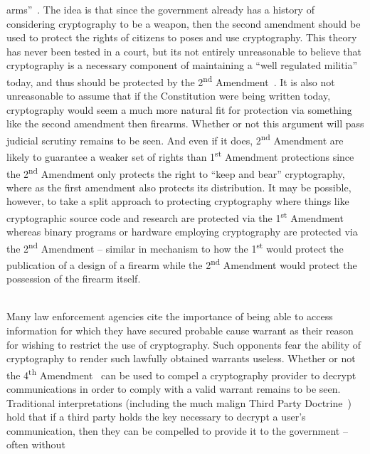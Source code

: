 \begin{packed_desc}
  arms''~\cite{us-constitution-amend2}. The idea is that since the
  government already has a history of considering cryptography to be a
  weapon, then the second amendment should be used to protect the
  rights of citizens to poses and use cryptography. This theory has
  never been tested in a court, but its not entirely unreasonable to
  believe that cryptography is a necessary component of maintaining a
  ``well regulated militia'' today, and thus should be protected by
  the 2\textsuperscript{nd} Amendment~\cite{scotus-usvmiller}. It is
  also not unreasonable to assume that if the Constitution were being
  written today, cryptography would seem a much more natural fit for
  protection via something like the second amendment then
  firearms. Whether or not this argument will pass judicial scrutiny
  remains to be seen. And even if it does, 2\textsuperscript{nd}
  Amendment are likely to guarantee a weaker set of rights than
  1\textsuperscript{st} Amendment protections since the
  2\textsuperscript{nd} Amendment only protects the right to ``keep
  and bear'' cryptography, where as the first amendment also protects
  its distribution. It may be possible, however, to take a split
  approach to protecting cryptography where things like cryptographic
  source code and research are protected via the 1\textsuperscript{st}
  Amendment whereas binary programs or hardware employing cryptography
  are protected via the 2\textsuperscript{nd} Amendment -- similar in
  mechanism to how the 1\textsuperscript{st} would protect the
  publication of a design of a firearm while the 2\textsuperscript{nd}
  Amendment would protect the possession of the firearm itself.
\item[4\textsuperscript{th} Amendment] \hfill \\ Many law enforcement
  agencies cite the importance of being able to access information for
  which they have secured probable cause warrant as their reason for
  wishing to restrict the use of cryptography. Such opponents fear the
  ability of cryptography to render such lawfully obtained warrants
  useless. Whether or not the 4\textsuperscript{th}
  Amendment~\cite{us-constitution-amend4} can be used to compel a
  cryptography provider to decrypt communications in order to comply
  with a valid warrant remains to be seen. Traditional interpretations
  (including the much malign Third Party
  Doctrine~\cite{thompson-thirdparty}) hold that if a third party
  holds the key necessary to decrypt a user's communication, then they
  can be compelled to provide it to the government -- often without

\end{packed_desc}
